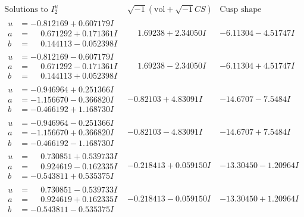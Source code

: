\documentclass[1p]{elsarticle_modified}
\theoremstyle{definition}
\newcommand{\I}{\sqrt{-1}}
\begin{document}
$$\begin{array}{c|c|c}  
\text{Solutions to }I^u_{2}& \I (\text{vol} + \sqrt{-1}CS) & \text{Cusp shape}\\
 \hline 
\begin{aligned}
u &= -0.812169 + 0.607179 I \\
a &= \phantom{-}0.671292 + 0.171361 I \\
b &= \phantom{-}0.144113 - 0.052398 I\end{aligned}
 & \phantom{-}1.69238 + 2.34050 I & -6.11304 - 4.51747 I \\ \hline\begin{aligned}
u &= -0.812169 - 0.607179 I \\
a &= \phantom{-}0.671292 - 0.171361 I \\
b &= \phantom{-}0.144113 + 0.052398 I\end{aligned}
 & \phantom{-}1.69238 - 2.34050 I & -6.11304 + 4.51747 I \\ \hline\begin{aligned}
u &= -0.946964 + 0.251366 I \\
a &= -1.156670 - 0.366820 I \\
b &= -0.466192 + 1.168730 I\end{aligned}
 & -0.82103 + 4.83091 I & -14.6707 - 7.5484 I \\ \hline\begin{aligned}
u &= -0.946964 - 0.251366 I \\
a &= -1.156670 + 0.366820 I \\
b &= -0.466192 - 1.168730 I\end{aligned}
 & -0.82103 - 4.83091 I & -14.6707 + 7.5484 I \\ \hline\begin{aligned}
u &= \phantom{-}0.730851 + 0.539733 I \\
a &= \phantom{-}0.924619 - 0.162335 I \\
b &= -0.543811 + 0.535375 I\end{aligned}
 & -0.218413 + 0.059150 I & -13.30450 - 1.20964 I \\ \hline\begin{aligned}
u &= \phantom{-}0.730851 - 0.539733 I \\
a &= \phantom{-}0.924619 + 0.162335 I \\
b &= -0.543811 - 0.535375 I\end{aligned}
 & -0.218413 - 0.059150 I & -13.30450 + 1.20964 I \\ \hline\begin{aligned}

\end{aligned}
\end{array}$$
\end{document}
